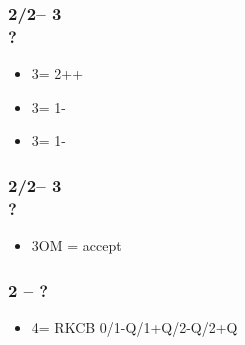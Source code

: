 \documentclass[12pt, a4paper]{article}
\begin{document}
\subsubsection*{2\hearts/2\spades -- 3\clubs \\ ?}
\begin{itemize}
    \item 3\diams = 2++\diams
    \item 3\hearts = 1-\clubs
    \item 3\spades = 1-\diams
\end{itemize}

\subsubsection*{2\hearts/2\spades -- 3\diams \\ ?}
\begin{itemize}
    \item 3OM = accept
\end{itemize}

\subsubsection*{2 -- ?}
\begin{itemize}
    \item 4\clubs = RKCB 0/1-Q/1+Q/2-Q/2+Q
\end{itemize}

\end{document}
